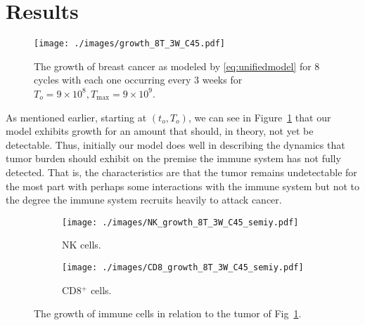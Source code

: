 \documentclass[11pt]{amsart}
\begin{document}
\section{Results}




\begin{figure}[h!]
\begin{center} %
\texttt{[image: ./images/growth\_8T\_3W\_C45.pdf]} %
\end{center}
\caption{The growth of breast cancer  as modeled by \eqref{eq:unifiedmodel} for 8 cycles with each one occurring every 3 weeks for $T_o=9\times 10^8, T_{\max}=9\times10^9$.}
\label{fig:FullODE} %
\end{figure}

As mentioned earlier, starting at $(t_o, T_o)$, we can see in Figure~\ref{fig:FullODE} that our model exhibits growth for an amount that should, in theory, not yet be detectable.
Thus, initially our model does well in describing the dynamics that tumor burden should exhibit on the premise the immune system has not fully detected.
That is, the characteristics are that the tumor remains undetectable for the most part with perhaps some interactions with the immune system but not to the degree the immune system recruits heavily to attack cancer.

\begin{figure}[h!]
\centering
	\begin{subfigure}{.5\textwidth}
  		\centering
 		 \texttt{[image: ./images/NK\_growth\_8T\_3W\_C45\_semiy.pdf]}
 		 \caption{NK cells.}
 		 \label{fig:NKGrowth}
	\end{subfigure}%
	\begin{subfigure}{.5\textwidth}
  		\centering
  		\texttt{[image: ./images/CD8\_growth\_8T\_3W\_C45\_semiy.pdf]}
  		\caption{CD8$^+$ cells.}
 		 \label{fig:CD8Growth}
	\end{subfigure}
	\caption{The growth of immune cells in relation to the tumor of Fig~\ref{fig:FullODE}.}
\end{figure}
\end{document}
